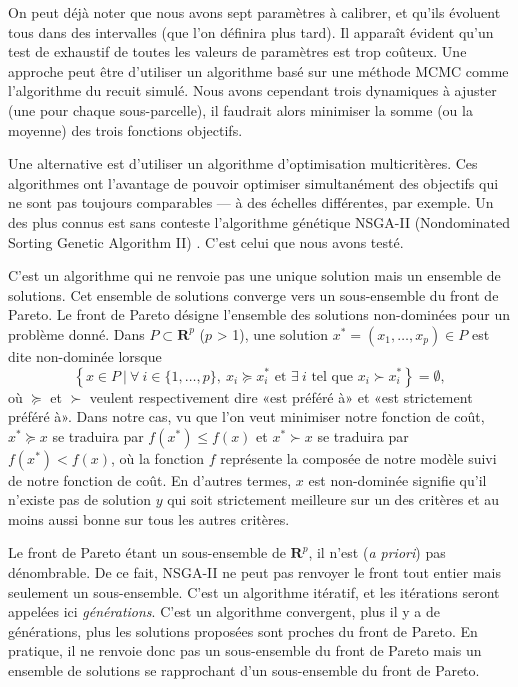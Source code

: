On peut déjà noter que nous avons sept paramètres à calibrer, et qu'ils évoluent tous dans des intervalles (que l'on définira plus tard).
Il apparaît évident qu'un test de exhaustif de toutes les valeurs de paramètres est trop coûteux.
Une approche peut être d'utiliser un algorithme basé sur une méthode MCMC comme l'algorithme du recuit simulé.
Nous avons cependant trois dynamiques à ajuster (une pour chaque sous-parcelle), il faudrait alors minimiser la somme (ou la moyenne) des trois fonctions objectifs.

Une alternative est d'utiliser un algorithme d'optimisation multicritères.
Ces algorithmes ont l'avantage de pouvoir optimiser simultanément des objectifs qui ne sont pas toujours comparables --- à des échelles différentes, par exemple.
Un des plus connus est sans conteste l'algorithme génétique NSGA-II (Nondominated Sorting Genetic Algorithm II) \citep{deb}.
C'est celui que nous avons testé.

C'est un algorithme qui ne renvoie pas une unique solution mais un ensemble de solutions. 
Cet ensemble de solutions converge vers un sous-ensemble du front de Pareto.
Le front de Pareto désigne l'ensemble des solutions non-dominées pour un problème donné.
Dans $P \subset \mathbf{R}^{p}$ ($p$ > 1), une solution $x^* = \left( x_1, \ldots, x_p \right) \in  P$ est dite non-dominée lorsque
\[
\left\{ x \in P\ |\ \forall\ i \in \{1, \ldots, p\},\ x_i \succcurlyeq x_i^* \text{ et } \exists\ i \text{ tel que } x_i \succ x_i^* \right\} = \emptyset,
\]
où $\succcurlyeq$ et $\succ$ veulent respectivement dire «est préféré à» et «est strictement préféré à». 
Dans notre cas, vu que l'on veut minimiser notre fonction de coût, $x^* \succcurlyeq x$ se traduira par $f(x^*) \leq f(x)$ et $x^* \succ x$ se traduira par $ f(x^*) < f(x)$, où la fonction $f$ représente la composée de notre modèle suivi de notre fonction de coût.
En d'autres termes, $x$ est non-dominée signifie qu'il n'existe pas de solution $y$ qui soit strictement meilleure sur un des critères et au moins aussi bonne sur tous les autres critères.

Le front de Pareto étant un sous-ensemble de $\mathbf{R}^{p}$, il n'est (\emph{a priori}) pas dénombrable.
De ce fait, NSGA-II ne peut pas renvoyer le front tout entier mais seulement un sous-ensemble.
C'est un algorithme itératif, et les itérations seront appelées ici \emph{générations}.
C'est un algorithme convergent, plus il y a de générations, plus les solutions proposées sont proches du front de Pareto.
En pratique, il ne renvoie donc pas un sous-ensemble du front de Pareto mais un ensemble de solutions se rapprochant d'un sous-ensemble du front de Pareto.

